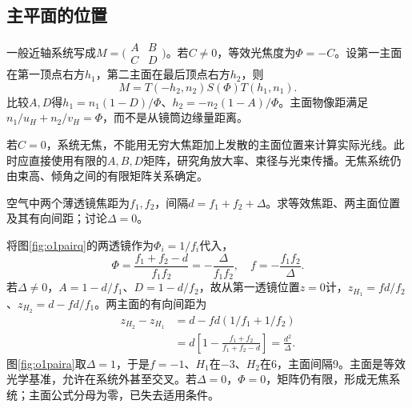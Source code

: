 \subsection{主平面的位置}
一般近轴系统写成$M=\bigl(\begin{smallmatrix}A&B\\C&D\end{smallmatrix}\bigr)$。若$C\ne0$，等效光焦度为$\Phi=-C$。设第一主面在第一顶点右方$h_1$，第二主面在最后顶点右方$h_2$，则
\[
 M=T(-h_2,n_2)S(\Phi)T(h_1,n_1).
\]
比较$A,D$得$h_1=n_1(1-D)/\Phi$、$h_2=-n_2(1-A)/\Phi$。主面物像距满足$n_1/u_H+n_2/v_H=\Phi$，而不是从镜筒边缘量距离。

若$C=0$，系统无焦，不能用无穷大焦距加上发散的主面位置来计算实际光线。此时应直接使用有限的$A,B,D$矩阵，研究角放大率、束径与光束传播。无焦系统仍由束高、倾角之间的有限矩阵关系确定。

\begin{example}\label{ex:o1pair}
空气中两个薄透镜焦距为$f_1,f_2$，间隔$d=f_1+f_2+\Delta$。求等效焦距、两主面位置及其有向间距；讨论$\Delta=0$。
\end{example}
\begin{solution}
将图\ref{fig:o1pairq}的两透镜作为$\Phi_i=1/f_i$代入，
\[
 \Phi=\frac{f_1+f_2-d}{f_1f_2}=-\frac\Delta{f_1f_2},\quad f=-\frac{f_1f_2}\Delta.
\]
若$\Delta\ne0$，$A=1-d/f_1$、$D=1-d/f_2$，故从第一透镜位置$z=0$计，$z_{H_1}=fd/f_2$、$z_{H_2}=d-fd/f_1$。两主面的有向间距为
\begin{align*}
 z_{H_2}-z_{H_1}
 &=d-fd(1/f_1+1/f_2)\\
 &=d\left[1-\frac{f_1+f_2}{f_1+f_2-d}\right]
 =\frac{d^2}\Delta.
\end{align*}
图\ref{fig:o1paira}取$\Delta=1$，于是$f=-1$、$H_1$在$-3$、$H_2$在6，主面间隔9。主面是等效光学基准，允许在系统外甚至交叉。若$\Delta=0$，$\Phi=0$，矩阵仍有限，形成无焦系统；主面公式分母为零，已失去适用条件。
\end{solution}

